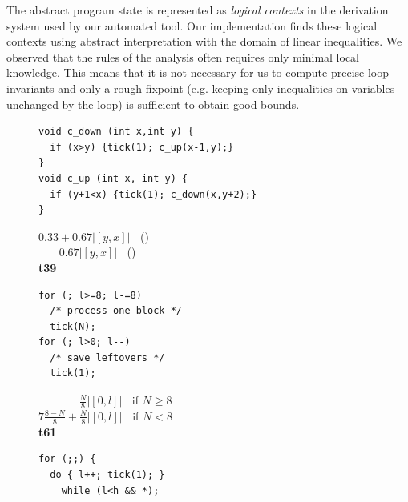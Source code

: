 \documentclass{sigplanconf}
\newcommand{\ifshort}[2]{\ifx\fullversion\undefined{#1}\else{#2}\fi}
\begin{document}
The abstract program state is represented as \emph{logical contexts} in the
derivation system used by our automated tool.
Our implementation finds these logical contexts using abstract
interpretation with the domain of linear inequalities.  We observed that
the rules of the analysis often requires only minimal local knowledge.
This means that it is not necessary for us to compute precise loop
invariants and only a rough fixpoint (e.g. keeping only inequalities on
variables unchanged by the loop) is sufficient to obtain good bounds.



\begin{figure}
  \centering
\ifshort{\vspace{-.3cm}
\hspace{-0.4cm}}{}
  \begin{minipage}[b]{7cm}
    \begin{center}
   \begin{lstlisting}[]
void c_down (int x,int y) {
  if (x>y) {tick(1); c_up(x-1,y);}
}
void c_up (int x, int y) {
  if (y+1<x) {tick(1); c_down(x,y+2);}
}
   \end{lstlisting}
\vspace{-2.7ex}
$0.33 + 0.67 |[y,x]|\;\;$ ()\\
$\;\;\;\;\;\;\,0.67 |[y,x]|\;\;$ ()
\\[.4\baselineskip]
      {\bf t39}
    \end{center}
  \end{minipage}
%
\hfill
%
  \begin{minipage}[b]{5cm}
    \begin{center}
   \begin{lstlisting}
for (; l>=8; l-=8)
  /* process one block */
  tick(N);
for (; l>0; l--)
  /* save leftovers */
  tick(1);
   \end{lstlisting}
\vspace{-2.8ex}
$\;\;\;\;\;\;\;\;\;\;\;\;\;\frac{N}{8} |[0,l]|\;\;$ if $N \geq 8$\\
$7\frac{8-N}{8} + \frac{N}{8}|[0,l]|\;\;$ if $N < 8$
\\[.4\baselineskip]
      {\bf t61}
    \end{center}
  \end{minipage}
%
\hfill
%
  \begin{minipage}[b]{5.5cm}
    \begin{center}
\begin{lstlisting}
for (;;) {
  do { l++; tick(1); }
    while (l<h && *);

\end{lstlisting}
\end{center}
\end{minipage}
\end{figure}
\end{document}
